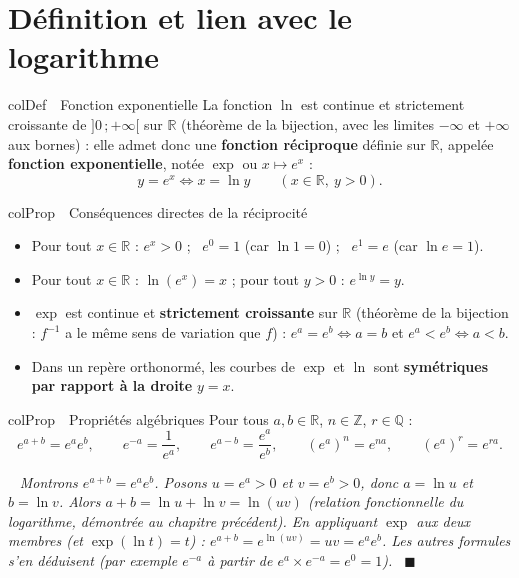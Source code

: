 \documentclass[11pt,a4paper]{article}
\newenvironment{definition}[1][Définition]
  {\begin{fiche}{colDef}{\ding{110}~~#1}}{\end{fiche}}
\newenvironment{propriete}[1][Propriété]
  {\begin{fiche}{colProp}{\ding{72}~~#1}}{\end{fiche}}
\newenvironment{demo}
  {\par\smallskip\noindent{\sffamily\bfseries\color{qtealdark}Démonstration.}\ \itshape}
  {\ \normalfont\hfill$\blacksquare$\par\medskip}
\begin{document}
\vspace{4mm}

\section{Définition et lien avec le logarithme}

\begin{definition}[Fonction exponentielle]
La fonction $\ln$ est continue et strictement croissante de $]0\,;+\infty[$ sur $\mathbb{R}$ (théorème de la bijection, avec les limites $-\infty$ et $+\infty$ aux bornes) : elle admet donc une \textbf{fonction réciproque} définie sur $\mathbb{R}$, appelée \textbf{fonction exponentielle}, notée $\exp$ ou $x \mapsto e^x$ :
\[
  y = e^x \iff x = \ln y \qquad (x \in \mathbb{R},\ y > 0).
\]
\end{definition}

\begin{propriete}[Conséquences directes de la réciprocité]
\begin{itemize}[leftmargin=6mm, itemsep=0.5mm]
  \item Pour tout $x \in \mathbb{R}$ : $e^x > 0$ ; \ $e^0 = 1$ (car $\ln 1 = 0$) ; \ $e^1 = e$ (car $\ln e = 1$).
  \item Pour tout $x \in \mathbb{R}$ : $\ln(e^x) = x$ ; pour tout $y > 0$ : $e^{\ln y} = y$.
  \item $\exp$ est continue et \textbf{strictement croissante} sur $\mathbb{R}$ (théorème de la bijection : $f^{-1}$ a le même sens de variation que $f$) : $e^a = e^b \iff a = b$ et $e^a < e^b \iff a < b$.
  \item Dans un repère orthonormé, les courbes de $\exp$ et $\ln$ sont \textbf{symétriques par rapport à la droite} $y = x$.
\end{itemize}
\end{propriete}

\begin{propriete}[Propriétés algébriques]
Pour tous $a, b \in \mathbb{R}$, $n \in \mathbb{Z}$, $r \in \mathbb{Q}$ :
\[
  e^{a+b} = e^a e^b, \qquad
  e^{-a} = \frac{1}{e^a}, \qquad
  e^{a-b} = \frac{e^a}{e^b}, \qquad
  \left(e^a\right)^n = e^{na}, \qquad
  \left(e^a\right)^r = e^{ra}.
\]
\end{propriete}

\begin{demo}
Montrons $e^{a+b}=e^ae^b$. Posons $u=e^a>0$ et $v=e^b>0$, donc $a=\ln u$ et $b=\ln v$. Alors $a+b = \ln u+\ln v = \ln(uv)$ (relation fonctionnelle du logarithme, démontrée au chapitre précédent). En appliquant $\exp$ aux deux membres (et $\exp(\ln t)=t$) : $e^{a+b} = e^{\ln(uv)} = uv = e^a e^b$. Les autres formules s'en déduisent (par exemple $e^{-a}$ à partir de $e^a \times e^{-a} = e^0 = 1$).
\end{demo}
\end{document}
